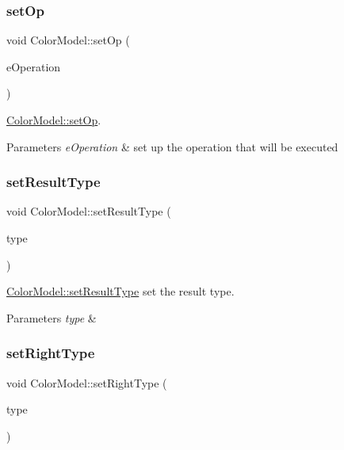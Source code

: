 \subsubsection{\texorpdfstring{set\+Op}{setOp}}
{\footnotesize\ttfamily void Color\+Model\+::set\+Op (\begin{DoxyParamCaption}\item[{Q\+String}]{e\+Operation }\end{DoxyParamCaption})\hspace{0.3cm}{\ttfamily [slot]}}



\hyperlink{class_color_model_ad51072410fbe8572066b3a53ca85a289}{Color\+Model\+::set\+Op}. 


\begin{DoxyParams}{Parameters}
{\em e\+Operation} & set up the operation that will be executed \\
\hline
\end{DoxyParams}
\mbox{\label{class_color_model_ae0c25592f1e201251a6090496548e762}} 
\subsubsection{\texorpdfstring{set\+Result\+Type}{setResultType}}
{\footnotesize\ttfamily void Color\+Model\+::set\+Result\+Type (\begin{DoxyParamCaption}\item[{Q\+String}]{type }\end{DoxyParamCaption})\hspace{0.3cm}{\ttfamily [slot]}}



\hyperlink{class_color_model_ae0c25592f1e201251a6090496548e762}{Color\+Model\+::set\+Result\+Type} set the result type. 


\begin{DoxyParams}{Parameters}
{\em type} & \\
\hline
\end{DoxyParams}
\mbox{\label{class_color_model_acad4c21bc8bcede62c821f6e87a44e38}} 
\subsubsection{\texorpdfstring{set\+Right\+Type}{setRightType}}
{\footnotesize\ttfamily void Color\+Model\+::set\+Right\+Type (\begin{DoxyParamCaption}\item[{Q\+String}]{type }\end{DoxyParamCaption})\hspace{0.3cm}{\ttfamily [slot]}}



